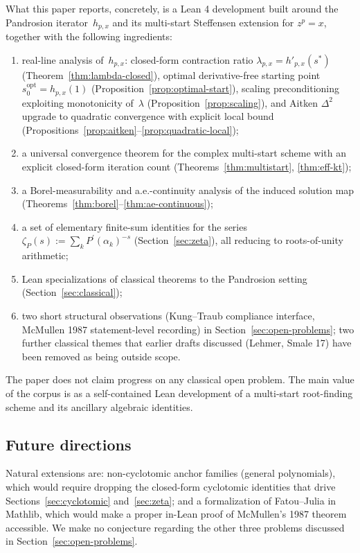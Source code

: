 \documentclass[11pt,a4paper]{article}
\theoremstyle{definition}
\theoremstyle{remark}
\begin{document}
What this paper reports, concretely, is a Lean 4 development built
around the Pandrosion iterator~$h_{p,x}$ and its multi-start Steffensen
extension for $z^p = x$, together with the following ingredients:
\begin{enumerate}
  \item real-line analysis of~$h_{p,x}$: closed-form contraction ratio
        $\lambda_{p,x} = h'_{p,x}(s^\ast)$
        (Theorem~\ref{thm:lambda-closed}), optimal derivative-free
        starting point $s_0^{\mathrm{opt}} = h_{p,x}(1)$
        (Proposition~\ref{prop:optimal-start}), scaling
        preconditioning exploiting monotonicity of~$\lambda$
        (Proposition~\ref{prop:scaling}), and Aitken $\Delta^2$
        upgrade to quadratic convergence with explicit local bound
        (Propositions~\ref{prop:aitken}--\ref{prop:quadratic-local});
  \item a universal convergence theorem for the complex multi-start
        scheme with an explicit closed-form iteration count
        (Theorems~\ref{thm:multistart}, \ref{thm:eff-kt});
  \item a Borel-measurability and a.e.-continuity analysis of the
        induced solution map (Theorems~\ref{thm:borel}--\ref{thm:ae-continuous});
  \item a set of elementary finite-sum identities for the series
        $\zeta_P(s) := \sum_k P^{\prime}(\alpha_k)^{-s}$
        (Section~\ref{sec:zeta}), all reducing to roots-of-unity arithmetic;
  \item Lean specializations of classical theorems to the Pandrosion
        setting (Section~\ref{sec:classical});
  \item two short structural observations (Kung--Traub compliance
        interface, McMullen 1987 statement-level recording) in
        Section~\ref{sec:open-problems}; two further classical themes
        that earlier drafts discussed (Lehmer, Smale 17) have been
        removed as being outside scope.
\end{enumerate}

The paper does not claim progress on any classical open problem. The
main value of the corpus is as a self-contained Lean development of a
multi-start root-finding scheme and its ancillary algebraic identities.

\subsection*{Future directions}

Natural extensions are: non-cyclotomic anchor families (general
polynomials), which would require dropping the closed-form cyclotomic
identities that drive Sections~\ref{sec:cyclotomic} and~\ref{sec:zeta};
and a formalization of Fatou--Julia in Mathlib, which would make a
proper in-Lean proof of McMullen's 1987 theorem accessible. We make
no conjecture regarding the other three problems discussed in
Section~\ref{sec:open-problems}.
\end{document}
